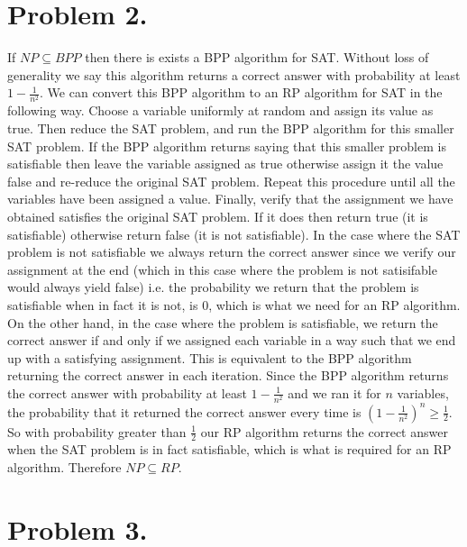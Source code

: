 \documentclass[12pt]{article}
\begin{document}
\newpage
\section*{Problem 2.}
If $NP \subseteq BPP$ then there is exists a BPP algorithm for SAT. Without
loss of generality we say this algorithm returns a correct answer with probability
at least $1 - \frac{1}{n^2}$. We can convert this BPP algorithm to an RP
algorithm for SAT in the following way. Choose a variable uniformly at random
and assign its value as true. Then reduce the SAT problem, and run the BPP
algorithm for this smaller SAT problem. If the BPP algorithm returns saying that this smaller
problem is satisfiable then leave the variable assigned as true otherwise assign
it the value false and re-reduce the original SAT problem. Repeat this procedure
until all the variables have been assigned a value. Finally, verify that the
assignment we have obtained satisfies the original SAT problem. If it does then
return true (it is satisfiable) otherwise return false (it is not satisfiable).
In the case where the SAT problem is not satisfiable we always return the correct
answer since we verify our assignment at the end (which in this case where the
problem is not satisifable would always yield false) i.e. the probability we
return that the problem is satisfiable when in fact it is not, is 0, which is what
we need for an RP algorithm. On the other hand, in the case where the problem is
satisfiable, we return the correct answer if and only if we assigned each variable
in a way such that we end up with a satisfying assignment. This is equivalent to
the BPP algorithm returning the correct answer in each iteration. Since the BPP
algorithm returns the correct answer with probability at least
$1 - \frac{1}{n^2}$ and we ran it for $n$ variables, the probability that it
returned the correct answer every time is
$(1 - \frac{1}{n^2})^n \ge \frac{1}{2}$. So with probability greater than
$\frac{1}{2}$ our RP algorithm returns the correct answer when the SAT problem
is in fact satisfiable, which is what is required for an RP algorithm.
Therefore $NP \subseteq RP$.

\newpage
\section*{Problem 3.}
\end{document}
